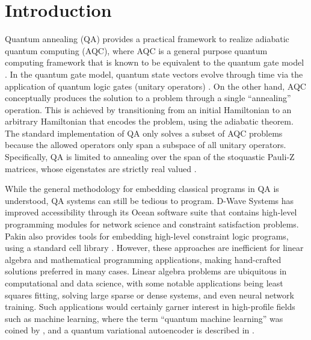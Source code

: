 \section{Introduction}

Quantum annealing (QA) provides a practical framework to realize adiabatic quantum computing (AQC), where AQC is a general purpose quantum computing framework that is known to be equivalent to the quantum gate model \cite{aharonov2008adiabatic}.
In the quantum gate model, quantum state vectors evolve through time via the application of quantum logic gates (unitary operators) \cite{steane1998quantum}.
On the other hand, AQC conceptually produces the solution to a problem through a single ``annealing'' operation.
This is achieved by transitioning from an initial Hamiltonian to an arbitrary Hamiltonian that encodes the problem, using the adiabatic theorem.
The standard implementation of QA only solves a subset of AQC problems because the allowed operators only span a subspace of all unitary operators.
Specifically, QA is limited to annealing over the span of the stoquastic Pauli-Z matrices, whose eigenstates are strictly real valued \cite{kadowaki1998quantum}.

While the general methodology for embedding classical programs in QA is understood, QA systems can still be tedious to program. D-Wave Systems has improved accessibility through its Ocean software suite that contains high-level programming modules for network science and constraint satisfaction problems.
Pakin also provides tools for embedding high-level constraint logic programs, using a standard cell library \cite{pakin2018performing}.
However, these approaches are inefficient for linear algebra and mathematical programming applications, making hand-crafted solutions preferred in many cases.
Linear algebra problems are ubiquitous in computational and data science, with some notable applications being least squares fitting, solving large sparse or dense systems, and even neural network training.
Such applications would certainly garner interest in high-profile fields such as machine learning, where the term ``quantum machine learning'' was coined by \cite{biamonte2017quantum}, and a quantum variational autoencoder is described in \cite{khoshaman2018quantum}.

